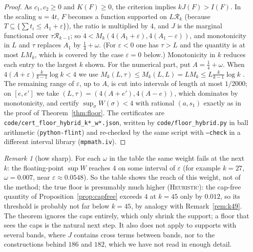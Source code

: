\documentclass[11pt]{amsart}
\theoremstyle{definition}
\theoremstyle{remark}
\newtheorem{remark}[theorem]{Remark}
\newcommand{\lbl}[1]{\textup{\textsc{#1}}}
\newcommand{\R}{\mathcal{R}}
\begin{document}
\begin{proof}
As $c_1,c_2\ge0$ and $K(F)\ge0$, the criterion implies $kJ(F)>I(F)$. In the
scaling $u=4t$, $F$ becomes a function supported on $L\R_k$ (because
$T\subseteq\{\sum t_i\le A_1+\varepsilon\}$), the ratio is multiplied by $4$,
and $J$ is the marginal functional over $\tau\R_{k-1}$; so
$4<M_k(4(A_1+\varepsilon),4(A_1-\varepsilon))$, and monotonicity in $L$ and
$\tau$ replaces $A_1$ by $\frac14+\omega$. (For $\varepsilon<0$ one has
$\tau>L$ and the quantity is at most $LM_k$, which is covered by the case
$\varepsilon=0$ below.) Monotonicity in $k$ reduces each entry to the largest
$k$ shown. For the numerical part, put $A=\frac14+\omega$. When
$4(A+\varepsilon)\frac{k}{k-1}\log k<4$ we use
$M_k(L,\tau)\le M_k(L,L)=LM_k\le L\frac{k}{k-1}\log k$
\cite[Cor.~6.4]{Pol14b}. The remaining range of $\varepsilon$, up to $A$, is
cut into intervals of length at most $1/2000$; on $[e,e']$ we take
$(L,\tau)=(4(A+e'),4(A-e))$, which dominates by monotonicity, and certify
$\sup_\sigma W(\sigma)<4$ with rational $(a,s_1)$ exactly as in the proof of
Theorem~\ref{thm:floor}. The certificates are
\texttt{code/cert\_floor\_hybrid\_k*\_w*.json}, written by
\texttt{code/floor\_hybrid.py} in ball arithmetic (\texttt{python-flint}) and
re-checked by the same script with \texttt{--check} in a different interval
library (\texttt{mpmath.iv}).
\end{proof}

\begin{remark}[how sharp]
For each $\omega$ in the table the same weight fails at the next $k$: the
floating-point $\sup W$ reaches $4$ on some interval of $\varepsilon$ (for
example $k=27$, $\omega=0.007$, near $\varepsilon\approx0.0548$). So the table
shows the reach of this weight, not of the method; the true floor is
presumably much higher (\lbl{Heuristic}): the cap-free quantity of
Proposition~\ref{prop:capfree} exceeds $4$ at $k=45$ only by $0.012$, so its
threshold is probably not far below $k=45$, by analogy with
Remark~\ref{rem:k49}. The theorem ignores the caps entirely, which only shrink the
support; a floor that sees the caps is the natural next step. It also does not
apply to supports with several bands, where $J$ contains cross terms between
bands, nor to the constructions behind $186$ and $182$, which we have not
read in enough detail.
\end{remark}
\end{document}

